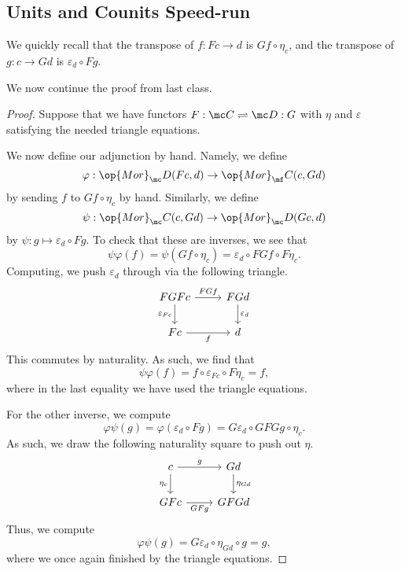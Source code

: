 \documentclass[../notes.tex]{subfiles}
\begin{document}

\subsection{Units and Counits Speed-run}
We quickly recall that the transpose of $f:Fc\to d$ is $Gf\circ\eta_c$, and the transpose of $g:c\to Gd$ is $\varepsilon_d\circ Fg$.

We now continue the proof from last class.
\adjointbyunits*
\begin{proof}
	Suppose that we have functors $F:\mc C\rightleftharpoons\mc D:G$ with $\eta$ and $\varepsilon$ satisfying the needed triangle equations.

	We now define our adjunction by hand. Namely, we define
	\[\varphi:\op{Mor}_\mc D(Fc,d)\to\op{Mor}_\mf C(c,Gd)\]
	by sending $f$ to $Gf\circ\eta_c$ by hand. Similarly, we define
	\[\psi:\op{Mor}_\mc C(c,Gd)\to\op{Mor}_\mc D(Gc,d)\]
	by $\psi:g\mapsto\varepsilon_d\circ Fg$. To check that these are inverses, we see that
	\[\psi\varphi(f)=\psi(Gf\circ\eta_c)=\varepsilon_d\circ FGf\circ F\eta_c.\]
	Computing, we push $\varepsilon_d$ through via the following triangle.
	\[\begin{tikzcd}
		FGFc & FGd \\
		Fc & d
		\arrow["FGf", from=1-1, to=1-2]
		\arrow["{\varepsilon_d}", from=1-2, to=2-2]
		\arrow["{\varepsilon_{Fc}}"', from=1-1, to=2-1]
		\arrow["f"', from=2-1, to=2-2]
	\end{tikzcd}\]
	This commutes by naturality. As such, we find that
	\[\psi\varphi(f)=f\circ\varepsilon_{Fc}\circ F\eta_c=f,\]
	where in the last equality we have used the triangle equations.

	For the other inverse, we compute
	\[\varphi\psi(g)=\varphi(\varepsilon_d\circ Fg)=G\varepsilon_d\circ GFGg\circ\eta_c.\]
	As such, we draw the following naturality square to push out $\eta$.
	\[\begin{tikzcd}
		c & Gd \\
		GFc & GFGd
		\arrow["{\eta_{Gd}}", from=1-2, to=2-2]
		\arrow["{\eta_c}"', from=1-1, to=2-1]
		\arrow["g", from=1-1, to=1-2]
		\arrow["GFg"', from=2-1, to=2-2]
	\end{tikzcd}\]
	Thus, we compute
	\[\varphi\psi(g)=G\varepsilon_d\circ\eta_{Gd}\circ g=g,\]
	where we once again finished by the triangle equations.


\end{proof}
\end{document}
